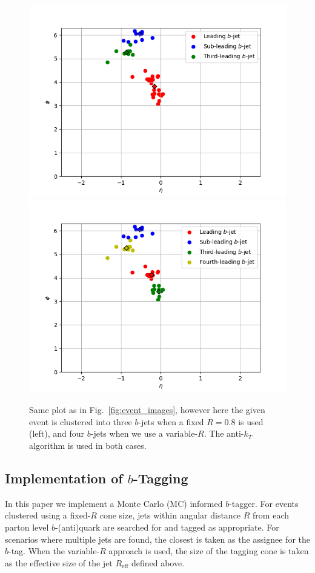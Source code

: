 \documentclass[12pt]{article}
\begin{document}
\begin{figure}[htb!]
	\begin{center}
	\includegraphics[scale=0.42]{plots/event_image_AK8_3bjets.png}
	\includegraphics[scale=0.42]{plots/event_image_varR_4bjets.png}
	 \end{center}
	\caption{Same plot as in Fig.~\ref{fig:event_images}, however here the given event is clustered into three $b$-jets when a fixed $R=0.8$ is used (left), and four $b$-jets when we use a variable-$R$. The anti-$k_T$ algorithm is used in both cases.}
\label{fig:event_images2}
\end{figure}

\subsection{Implementation of $b$-Tagging}\label{btagging}
In this paper we implement a Monte Carlo (MC) informed $b$-tagger. For events clustered using a fixed-$R$ cone size, jets within angular distance $R$ from each parton level $b$-(anti)quark are searched for and tagged as appropriate. For scenarios where multiple jets are found, the closest is taken as the assignee for the $b$-tag. When the variable-$R$ approach is used, the size of the tagging cone is taken as the effective size of the jet $R_{\text{eff}}$ defined above.
\end{document}
